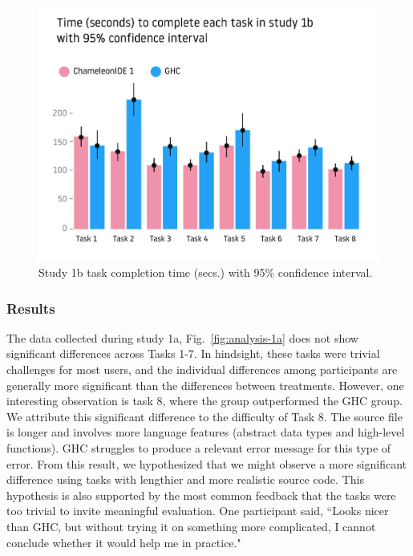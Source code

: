 \begin{figure}
    \centering
    \includegraphics[width=0.8\linewidth,trim=12mm 15mm 12mm 35mm,clip]{images/user-study-1b.pdf}
    \caption{Study 1b task completion time (secs.) with 95\% confidence interval.}
    \label{fig:analysis-1b}
\end{figure}

\subsubsection*{\textbf {Results}}

The data collected during study 1a, Fig.~\ref{fig:analysis-1a} does not show significant differences across Tasks 1-7. In hindsight, these tasks were trivial challenges for most users, and the individual differences among participants are generally more significant than the differences between treatments. However, one interesting observation is task 8, where the \chameleon{} group outperformed the GHC group. We attribute this significant difference to the difficulty of Task 8. The source file is longer and involves more language features (abstract data types and high-level functions). GHC struggles to produce a relevant error message for this type of error. 
From this result, we hypothesized that we might observe a more significant difference using tasks with lengthier and more realistic source code. 
This hypothesis is also supported by the most common feedback that the tasks were too trivial to invite meaningful evaluation. One participant said, ``Looks nicer than GHC, but without trying it on something more complicated, I cannot conclude whether it would help me in practice." 

